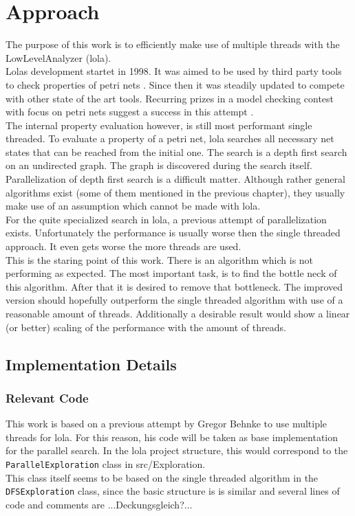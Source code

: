 \chapter{Approach}

The purpose of this work is to efficiently make use of multiple threads with the LowLevelAnalyzer (lola).\\
Lolas development startet in 1998. It was aimed to be used by third party tools to check properties of petri nets \cite{schmidt2000lola}. Since then it was steadily updated to compete with other state of the art tools. Recurring prizes in a model checking contest with focus on petri nets suggest a success in this attempt \cite{MCC2017}.\\
The internal property evaluation however, is still most performant single threaded. To evaluate a property of a petri net, lola searches all necessary net states that can be reached from the initial one. The search is a depth first search on an undirected graph. The graph is discovered during the search itself.\\
Parallelization of depth first search is a difficult matter. Although rather general algorithms exist (some of them mentioned in the previous chapter), they usually make use of an assumption which cannot be made with lola.\\
For the quite specialized search in lola, a previous attempt of parallelization exists. Unfortunately the performance is usually worse then the single threaded approach. It even gets worse the more threads are used.\\
This is the staring point of this work. There is an algorithm which is not performing as expected. The most important task, is to find the bottle neck of this algorithm. After that it is desired to remove that bottleneck. The improved version should hopefully outperform the single threaded algorithm with use of a reasonable amount of threads. Additionally a desirable result would show a linear (or better) scaling of the performance with the amount of threads.

\section{Implementation Details}
\subsection{Relevant Code}
This work is based on a previous attempt by Gregor Behnke to use multiple threads for lola. For this reason, his code will be taken as base implementation for the parallel search. In the lola project structure, this would correspond to the \texttt{ParallelExploration} class in src/Exploration.\\
This class itself seems to be based on the single threaded algorithm in the \texttt{DFSExploration} class, since the basic structure is is similar and several lines of code and comments are ...Deckungsgleich?...

